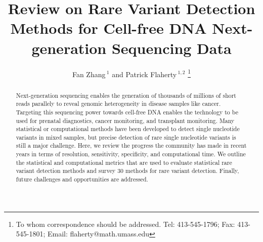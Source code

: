 \documentclass[a4,center,fleqn]{NAR}
\begin{document}
\title{Review on Rare Variant Detection Methods for Cell-free DNA Next-generation Sequencing Data}

\author{%
Fan Zhang\,$^{1}$
and Patrick Flaherty\,$^{1, 2}$
\footnote{To whom correspondence should be addressed.
Tel: 413-545-1796; Fax: 413-545-1801; Email: flaherty@math.umass.edu}}



\address{%
$^{1}$Department of Biomedical Engineering, Worcester Polytechnic Institute, MA, USA
and
$^{2}$Department of Mathematics and Statistics, University of Massachusetts, Amherst, MA, USA}


\maketitle

\begin{abstract}
Next-generation sequencing enables the generation of thousands of millions of short reads parallely to reveal genomic heterogeneity in disease samples like cancer.
Targeting this sequencing power towards cell-free DNA enables the technology to be used for prenatal diagnostics, cancer monitoring, and transplant monitoring.
Many statistical or computational methods have been developed to detect single nucleotide variants in mixed samples, but precise detection of rare single nucleotide variants is still a major challenge.
Here, we review the progress the community has made in recent years in terms of resolution, sensitivity, specificity, and computational time.
We outline the statistical and computational metrics that are used to evaluate statistical rare variant detection methods and survey 30 methods for rare variant detection.
Finally, future challenges and opportunities are addressed.

\end{abstract}
\end{document}
